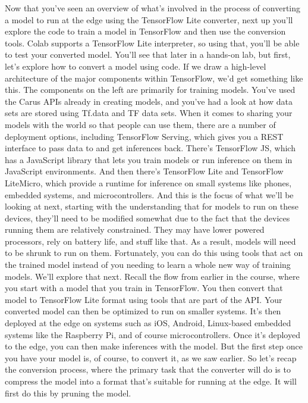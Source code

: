 Now that you've seen an overview of what's
involved in the process of converting a model
to run at the edge using the TensorFlow Lite converter,
next up you'll explore the code to train a model in TensorFlow
and then use the conversion tools.
Colab supports a TensorFlow Lite interpreter, so using that,
you'll be able to test your converted model.
You'll see that later in a hands-on lab, but first,
let's explore how to convert a model using code.
If we draw a high-level architecture of the major components within TensorFlow,
we'd get something like this.
The components on the left are primarily for training models.
You've used the Carus APIs already in creating models,
and you've had a look at how data sets are
stored using Tf.data and TF data sets.
When it comes to sharing your models with the world
so that people can use them, there are a number of deployment options,
including TensorFlow Serving, which gives you a REST interface
to pass data to and get inferences back.
There's TensorFlow JS, which has a JavaScript library that
lets you train models or run inference on them in JavaScript environments.
And then there's TensorFlow Lite and TensorFlow LiteMicro,
which provide a runtime for inference on small systems like phones,
embedded systems, and microcontrollers.
And this is the focus of what we'll be looking at next,
starting with the understanding that for models to run on these devices,
they'll need to be modified somewhat due to the fact
that the devices running them are relatively constrained.
They may have lower powered processors, rely on battery life,
and stuff like that.
As a result, models will need to be shrunk to run on them.
Fortunately, you can do this using tools that
act on the trained model instead of you needing
to learn a whole new way of training models.
We'll explore that next.
Recall the flow from earlier in the course, where you start with a model
that you train in TensorFlow.
You then convert that model to TensorFlow Lite format
using tools that are part of the API.
Your converted model can then be optimized to run on smaller systems.
It's then deployed at the edge on systems such as iOS, Android,
Linux-based embedded systems like the Raspberry Pi,
and of course microcontrollers.
Once it's deployed to the edge, you can then make inferences with the model.
But the first step once you have your model
is, of course, to convert it, as we saw earlier.
So let's recap the conversion process, where
the primary task that the converter will do
is to compress the model into a format that's
suitable for running at the edge.
It will first do this by pruning the model.

